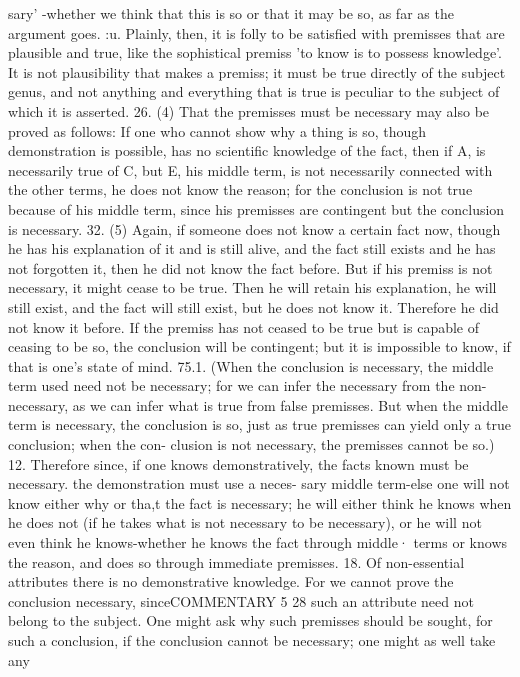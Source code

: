 {{{{{{sary' -whether we think that this is so or that it may be so,
as far as the argument goes.
:u. Plainly, then, it is folly to be satisfied with premisses that
are plausible and true, like the sophistical premiss 'to know is to
possess knowledge'. It is not plausibility that makes a premiss;
it must be true directly of the subject genus, and not anything
and everything that is true is peculiar to the subject of which
it is asserted.
26. (4) That the premisses must be necessary may also be
proved as follows: If one who cannot show why a thing is so,
though demonstration is possible, has no scientific knowledge of
the fact, then if A, is necessarily true of C, but E, his middle term,
is not necessarily connected with the other terms, he does not
know the reason; for the conclusion is not true because of his
middle term, since his premisses are contingent but the conclusion
is necessary.
32. (5) Again, if someone does not know a certain fact now,
though he has his explanation of it and is still alive, and the fact
still exists and he has not forgotten it, then he did not know the
fact before. But if his premiss is not necessary, it might cease
to be true. Then he will retain his explanation, he will still exist,
and the fact will still exist, but he does not know it. Therefore
he did not know it before. If the premiss has not ceased to be
true but is capable of ceasing to be so, the conclusion will be
contingent; but it is impossible to know, if that is one's state of
mind.
75.1. (When the conclusion is necessary, the middle term used
need not be necessary; for we can infer the necessary from the
non-necessary, as we can infer what is true from false premisses.
But when the middle term is necessary, the conclusion is so, just
as true premisses can yield only a true conclusion; when the con-
clusion is not necessary, the premisses cannot be so.)
12. Therefore since, if one knows demonstratively, the facts
known must be necessary. the demonstration must use a neces-
sary middle term-else one will not know either why or tha,t the
fact is necessary; he will either think he knows when he does not
(if he takes what is not necessary to be necessary), or he will not
even think he knows-whether he knows the fact through middle·
terms or knows the reason, and does so through immediate
premisses.
18. Of non-essential attributes there is no demonstrative
knowledge. For we cannot prove the conclusion necessary, sinceCOMMENTARY
5 28
such an attribute need not belong to the subject. One might
ask why such premisses should be sought, for such a conclusion,
if the conclusion cannot be necessary; one might as well take any
}}}}}}
